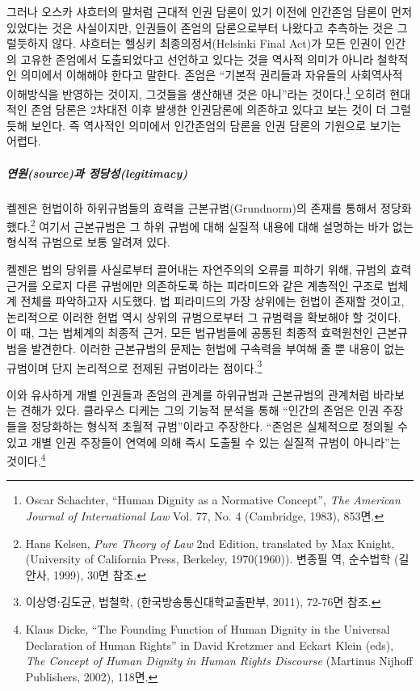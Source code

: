 그러나 오스카 샤흐터의 말처럼 근대적 인권 담론이 있기 이전에 인간존엄 담론이 먼저 있었다는 것은 사실이지만, 인권들이 존엄의 담론으로부터 나왔다고 추측하는 것은 그럴듯하지 않다. 샤흐터는 헬싱키 최종의정서(Helsinki Final Act)가 모든 인권이 인간의 고유한 존엄에서 도출되었다고 선언하고 있다는 것을 역사적 의미가 아니라 철학적인 의미에서 이해해야 한다고 말한다. 존엄은 ``기본적 권리들과 자유들의 사회역사적 이해방식을 반영하는 것이지, 그것들을 생산해낸 것은 아니''라는 것이다.\footnote{Oscar Schachter, ``Human Dignity as a Normative Concept'', \emph{The American Journal of International Law} Vol. 77, No. 4 (Cambridge, 1983), 853면.} 오히려 현대적인 존엄 담론은 2차대전 이후 발생한 인권담론에 의존하고 있다고 보는 것이 더 그럴듯해 보인다. 즉 역사적인 의미에서 인간존엄의 담론을 인권 담론의 기원으로 보기는 어렵다.

\subparagraph{연원(source)과 정당성(legitimacy)}

켈젠은 헌법이하 하위규범들의 효력을 근본규범(Grundnorm)의 존재를 통해서 정당화했다.\footnote{Hans Kelsen, \emph{Pure Theory of Law} 2nd Edition, translated by Max Knight, (University of California Press, Berkeley, 1970(1960)). 변종필 역, 순수법학 (길안사, 1999), 30면 참조.} 여기서 근본규범은 그 하위 규범에 대해 실질적 내용에 대해 설명하는 바가 없는 형식적 규범으로 보통 알려져 있다.

켈젠은 법의 당위를 사실로부터 끌어내는 자연주의의 오류를 피하기 위해, 규범의 효력근거를 오로지 다른 규범에만 의존하도록 하는 피라미드와 같은 계층적인 구조로 법체계 전체를 파악하고자 시도했다. 법 피라미드의 가장 상위에는 헌법이 존재할 것이고, 논리적으로 이러한 헌법 역시 상위의 규범으로부터 그 규범력을 확보해야 할 것이다. 이 때, 그는 법체계의 최종적 근거, 모든 법규범들에 공통된 최종적 효력원천인 근본규범을 발견한다. 이러한 근본규범의 문제는 헌법에 구속력을 부여해 줄 뿐 내용이 없는 규범이며 단지 논리적으로 전제된 규범이라는 점이다.\footnote{이상영⋅김도균, 법철학, (한국방송통신대학교출판부, 2011), 72-76면 참조.}

이와 유사하게 개별 인권들과 존엄의 관계를 하위규범과 근본규범의 관계처럼 바라보는 견해가 있다. 클라우스 디케는 그의 기능적 분석을 통해 ``인간의 존엄은 인권 주장들을 정당화하는 형식적 초월적 규범''이라고 주장한다. ``존엄은 실체적으로 정의될 수 있고 개별 인권 주장들이 연역에 의해 즉시 도출될 수 있는 실질적 규범이 아니라''는 것이다.\footnote{Klaus Dicke, ``The Founding Function of Human Dignity in the Universal Declaration of Human Rights'' in David Kretzmer and Eckart Klein (eds), \emph{The Concept of Human Dignity in Human Rights Discourse} (Martinus Nijhoff Publishers, 2002), 118면.}

